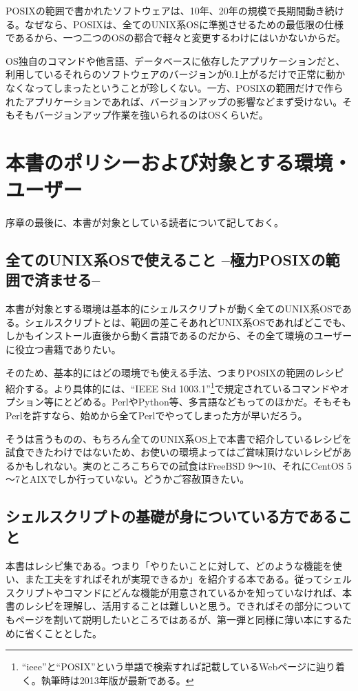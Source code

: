 POSIXの範囲で書かれたソフトウェアは、10年、20年の規模で長期間動き続ける。なぜなら、POSIXは、全てのUNIX系OSに準拠させるための最低限の仕様であるから、一つ二つのOSの都合で軽々と変更するわけにはいかないからだ。

OS独自のコマンドや他言語、データベースに依存したアプリケーションだと、利用しているそれらのソフトウェアのバージョンが0.1上がるだけで正常に動かなくなってしまったということが珍しくない。一方、POSIXの範囲だけで作られたアプリケーションであれば、バージョンアップの影響などまず受けない。そもそもバージョンアップ作業を強いられるのはOSくらいだ。


\section*{本書のポリシーおよび対象とする環境・ユーザー}

序章の最後に、本書が対象としている読者について記しておく。

\subsection*{全てのUNIX系OSで使えること --極力POSIXの範囲で済ませる--}

本書が対象とする環境は基本的にシェルスクリプトが動く全てのUNIX系OSである。シェルスクリプトとは、範囲の差こそあれどUNIX系OSであればどこでも、しかもインストール直後から動く言語であるのだから、その全て環境のユーザーに役立つ書籍でありたい。

そのため、基本的にはどの環境でも使える手法、つまりPOSIXの範囲のレシピ紹介する。より具体的には、``IEEE Std 1003.1''\footnote{``ieee''と``POSIX''という単語で検索すれば記載しているWebページに辿り着く。執筆時は2013年版が最新である。}で規定されているコマンドやオプション等にとどめる。PerlやPython等、多言語などもってのほかだ。そもそもPerlを許すなら、始めから全てPerlでやってしまった方が早いだろう。

そうは言うものの、もちろん全てのUNIX系OS上で本書で紹介しているレシピを試食できたわけではないため、お使いの環境よってはご賞味頂けないレシピがあるかもしれない。実のところこちらでの試食はFreeBSD 9～10、それにCentOS 5～7とAIXでしか行っていない。どうかご容赦頂きたい。

\subsection*{シェルスクリプトの基礎が身についている方であること}

本書はレシピ集である。つまり「やりたいことに対して、どのような機能を使い、また工夫をすればそれが実現できるか」を紹介する本である。従ってシェルスクリプトやコマンドにどんな機能が用意されているかを知っていなければ、本書のレシピを理解し、活用することは難しいと思う。できればその部分についてもページを割いて説明したいところではあるが、第一弾と同様に薄い本にするために省くこととした。

